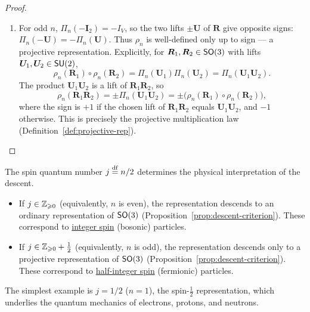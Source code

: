 \documentclass[11pt,reqno]{amsart}
\begin{document}
\begin{proof}
\begin{enumerate}
\item For odd $n$, $\Pi_n(-\bm I_2)=-I_V$, so the two lifts
$\pm\bm U$ of $\bm R$ give opposite signs:
$\Pi_n(-\bm U)=-\Pi_n(\bm U)$.
Thus $\rho_n$ is well-defined only up to sign — a projective
representation.
Explicitly, for $\bm R_1,\bm R_2\in\operatorname{\mathsf{SO}}(3)$ with lifts
$\bm U_1,\bm U_2\in\operatorname{\mathsf{SU}}(2)$,
\[
\rho_n(\bm R_1)\circ\rho_n(\bm R_2)
=\Pi_n(\bm U_1)\Pi_n(\bm U_2)
=\Pi_n(\bm U_1\bm U_2).
\]
The product $\bm U_1\bm U_2$ is a lift of $\bm R_1\bm R_2$, so
\[
\rho_n(\bm R_1\bm R_2)=\pm\Pi_n(\bm U_1\bm U_2)
=\pm\Big(\rho_n(\bm R_1)\circ\rho_n(\bm R_2)\Big),
\]
where the sign is $+1$ if the chosen lift of $\bm R_1\bm R_2$
equals $\bm U_1\bm U_2$, and $-1$ otherwise.
This is precisely the projective multiplication law
(Definition~\ref{def:projective-rep}).
\end{enumerate}
\end{proof}

\begin{remark}
The spin quantum number $j\stackrel{\mathrm{df}}{=} n/2$ determines the physical
interpretation of the descent.
\begin{itemize}
\item If $j\in\mathbb{Z}_{\geqslant 0}$ (equivalently, $n$ is even), the
representation descends to an ordinary representation of $\operatorname{\mathsf{SO}}(3)$
(Proposition~\ref{prop:descent-criterion}).
These correspond to \ul{integer spin} (bosonic) particles.
\item If $j\in\mathbb{Z}_{\geqslant 0}+\tfrac{1}{2}$ (equivalently, $n$ is odd),
the representation descends only to a projective representation of
$\operatorname{\mathsf{SO}}(3)$ (Proposition~\ref{prop:descent-criterion}).
These correspond to \ul{half-integer spin} (fermionic) particles.
\end{itemize}
The simplest example is $j=1/2$ ($n=1$), the spin-$\tfrac{1}{2}$
representation, which underlies the quantum mechanics of electrons,
protons, and neutrons.
\end{remark}
\end{document}
